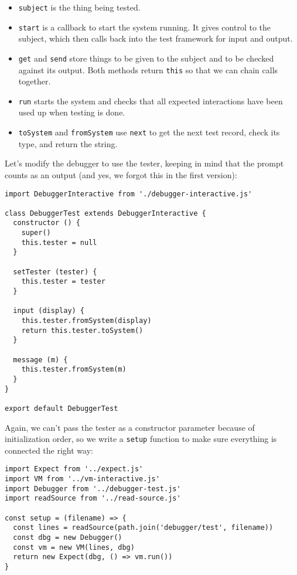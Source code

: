 \documentclass[krantzl]{krantz}
\begin{document}
\begin{itemize}

\item \texttt{subject} is the thing being tested.

\item \texttt{start} is a callback to start the system running.
    It gives control to the subject,
    which then calls back into the test framework for input and output.

\item \texttt{get} and \texttt{send} store things to be given to the subject
    and to be checked against its output.
    Both methods return \texttt{this} so that we can chain calls together.

\item \texttt{run} starts the system
    and checks that all expected interactions have been used up when testing is done.

\item \texttt{toSystem} and \texttt{fromSystem} use \texttt{next} to get the next test record,
    check its type,
    and return the string.

\end{itemize}


Let’s modify the debugger to use the tester,
keeping in mind that the prompt counts as an output
(and yes, we forgot this in the first version):


\begin{lstlisting}[frame=tblr]
import DebuggerInteractive from './debugger-interactive.js'

class DebuggerTest extends DebuggerInteractive {
  constructor () {
    super()
    this.tester = null
  }

  setTester (tester) {
    this.tester = tester
  }

  input (display) {
    this.tester.fromSystem(display)
    return this.tester.toSystem()
  }

  message (m) {
    this.tester.fromSystem(m)
  }
}

export default DebuggerTest
\end{lstlisting}



Again,
we can’t pass the tester as a constructor parameter because of initialization order,
so we write a \texttt{setup} function to make sure everything is connected the right way:


\begin{lstlisting}[frame=tblr]
import Expect from '../expect.js'
import VM from '../vm-interactive.js'
import Debugger from '../debugger-test.js'
import readSource from '../read-source.js'

const setup = (filename) => {
  const lines = readSource(path.join('debugger/test', filename))
  const dbg = new Debugger()
  const vm = new VM(lines, dbg)
  return new Expect(dbg, () => vm.run())
}
\end{lstlisting}
\end{document}
